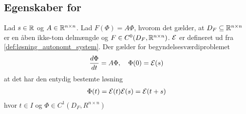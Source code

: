 \subsection[Egenskaber for \texorpdfstring{$e^{tA}$}{exp(tA)}]{Egenskaber for }


\begin{minipage}\textwidth
\begin{thmx} \textbf{} \label{sæt:begyndelsesværdiproblemet_for_phi}%
\newline
Lad $s\in \mathbb{R}$ og $A\in \mathbb{R}^{n\times n}$. Lad $F(\Phi)=A\Phi$, hvorom det gælder, at $D_F \subseteq \mathbb{R}^{n\times n}$ er en åben ikke-tom delmængde og $F \in C^0(D_F,\mathbb{R}^{n\times n})$. $\mathcal{E}$ er defineret ud fra \autoref{def:løsning_autonomt_system}.
Der gælder for begyndelsesværdiproblemet
%
\begin{align}\label{eq:begyndelsesværdiproblemet_for_phi}
    \frac{d\Phi}{dt}= A\Phi, \quad \Phi(0) = \mathcal{E}(s)
\end{align}
%
at det har den entydig bestemte løsning
%
\begin{align}
    \Phi(t) = \mathcal{E}(t)\mathcal{E}(s) = \mathcal{E}(t+s)
\end{align}
%
hvor $t\in I$ og $\Phi\in C^1(D_F,R^{n\times n})$
%
\end{thmx}
\end{minipage}

